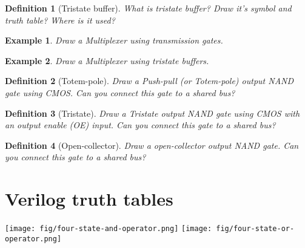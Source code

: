 \documentclass{article}
\newtheorem{example}{Example}
\newtheorem{definition}{Definition}
\begin{document}
\begin{definition}[Tristate buffer]
  What is tristate buffer? Draw it's symbol and truth table? Where is it used?
\end{definition}
\vspace{10em}

\begin{example}
Draw a Multiplexer using transmission gates.
\end{example}
\vspace{10em}

\begin{example}
  Draw a Multiplexer using tristate buffers.
\end{example}
\vspace{10em}


\begin{definition}[Totem-pole]
  Draw a Push-pull (or Totem-pole) output NAND gate using CMOS. Can you connect
  this gate to a shared bus?
\end{definition}
\vspace{10em}

\begin{definition}[Tristate]
  Draw a Tristate output NAND gate using CMOS with an output enable (OE) input.
  Can you connect this gate to a shared bus?
\end{definition}
\vspace{10em}

\begin{definition}[Open-collector]
  Draw a open-collector output NAND gate. Can you connect this gate to a shared bus?
\end{definition}
\vspace{10em}

\section{Verilog truth tables}

\texttt{[image: fig/four-state-and-operator.png]}
\texttt{[image: fig/four-state-or-operator.png]}



\end{document}
